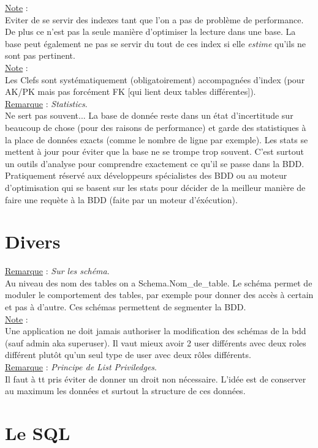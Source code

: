\documentclass[a4paper,12pt,twoside]{article}
\newcommand{\rem}[2]{\noindent\underline{Remarque} : \textit{#1}.\\ \indent #2}
\newcommand{\note}[1]{\noindent\underline{Note} : \\ \indent #1}
\begin{document}
\note{Eviter de se servir des indexes tant que l'on a pas de problème de performance. De plus ce n'est pas la seule manière d'optimiser la lecture dans une base. La base peut également ne pas se servir du tout de ces index si elle \textit{estime} qu'ils ne sont pas pertinent.}\\

\note{Les Clefs sont systématiquement (obligatoirement) accompagnées d'index (pour AK/PK mais pas forcément FK [qui lient deux tables différentes]).}\\

\rem{Statistics}{Ne sert pas souvent... La base de donnée reste dans un état d'incertitude sur beaucoup de chose (pour des raisons de performance) et garde des statistiques à la place de données exacts (comme le nombre de ligne par exemple). Les stats se mettent à jour pour éviter que la base ne se trompe trop souvent. C'est surtout un outils d'analyse pour comprendre exactement ce qu'il se passe dans la BDD. Pratiquement réservé aux développeurs spécialistes des BDD ou au moteur d'optimisation qui se basent sur les stats pour décider de la meilleur manière de faire une requète à la BDD (faite par un moteur d'éxécution).}\\

\section{Divers}

\rem{Sur les schéma}{Au niveau des nom des tables on a Schema.Nom_de_table. Le schéma permet de moduler le comportement des tables, par exemple pour donner des accès à certain et pas à d'autre. Ces schémas permettent de segmenter la BDD.}\\

\note{Une application ne doit jamais authoriser la modification des schémas de la bdd (sauf admin aka superuser). Il vaut mieux avoir 2 user différents avec deux roles différent plutôt qu'un seul type de user avec deux rôles différents.}\\

\rem{Principe de List Priviledges}{Il faut à tt pris éviter de donner un droit non nécessaire. L'idée est de conserver au maximum les données et surtout la structure de ces données.}\\

\section{Le SQL}
\end{document}
